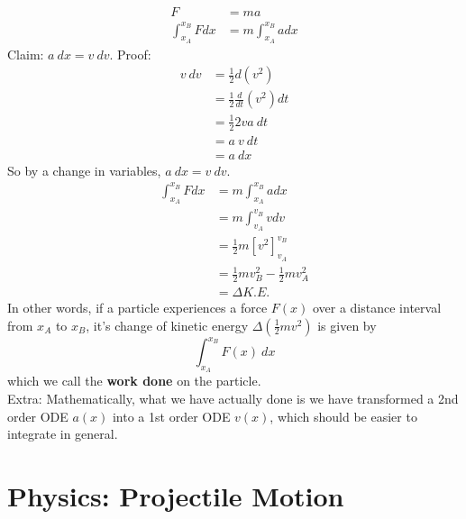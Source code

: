 \documentclass{article}
\begin{document}
\begin{align}
    F &= ma \\
    \int_{x_A}^{x_B} F dx &= m \int_{x_A}^{x_B} a dx 
\end{align}
Claim: $a\ dx = v\ dv$. Proof: 
\begin{align}
v\ dv
& = \frac{1}{2} d\left(v^2\right) \\
& =\frac{1}{2} \frac{d}{d t}\left(v^2\right) d t \\
& =\frac{1}{2} 2 v a\ d t \\
& =a\ v\ d t \\
& =a \ d x
\end{align}
So by a change in variables, $a\ dx = v\ dv$. 
\begin{align}
    \int_{x_A}^{x_B} F dx &= m \int_{x_A}^{x_B} a dx \\
    &= m \int_{v_A}^{v_B} v dv \\
    &= \frac{1}{2} m \left[v^2\right]_{v_A}^{v_B} \\
    &= \frac{1}{2} m v_B^2 - \frac{1}{2} mv_A^2 \\
    &= \Delta K.E.
\end{align}
In other words, if a particle experiences a force $F(x)$ over a distance interval from $x_A$ to $x_B$, it's change of kinetic energy $\Delta\left(\frac{1}{2}mv^2\right)$ is given by $$\int_{x_A}^{x_B} F(x)\ dx$$
which we call the \textbf{work done} on the particle.\\[10pt]
Extra: Mathematically, what we have actually done is we have transformed a 2nd order ODE $a(x)$ into a 1st order ODE $v(x)$, which should be easier to integrate in general.

\section{Physics: Projectile Motion}
\end{document}

